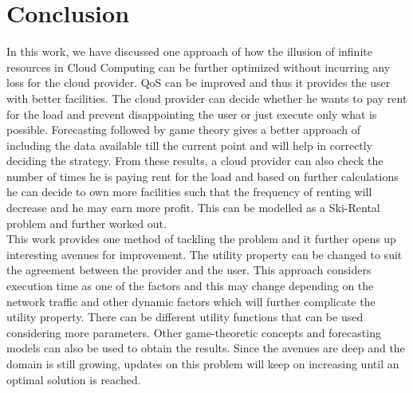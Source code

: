 \chapter{Conclusion}
In this work, we have discussed one approach of how the illusion of infinite resources in Cloud Computing can be further optimized without incurring any loss for the cloud provider. QoS can be improved and thus it provides the user with better facilities. The cloud provider can decide whether he wants to pay rent for the load and prevent disappointing the user or just execute only what is possible. Forecasting followed by game theory gives a better approach of including the data available till the current point and will help in correctly deciding the strategy. From these results, a cloud provider can also check the number of times he is paying rent for the load and based on further calculations he can decide to own more facilities such that the frequency of renting will decrease and he may earn more profit. This can be modelled as a Ski-Rental problem and further worked out.\\[0.2cm]
This work provides one method of tackling the problem and it further opens up interesting avenues for improvement. The utility property can be changed to suit the agreement between the provider and the user. This approach considers execution time as one of the factors and this may change depending on the network traffic and other dynamic factors which will further complicate the utility property. There can be different utility functions that can be used considering more parameters. Other game-theoretic concepts and forecasting models can also be used to obtain the results. Since the avenues are deep and the domain is still growing, updates on this problem will keep on increasing until an optimal solution is reached.
